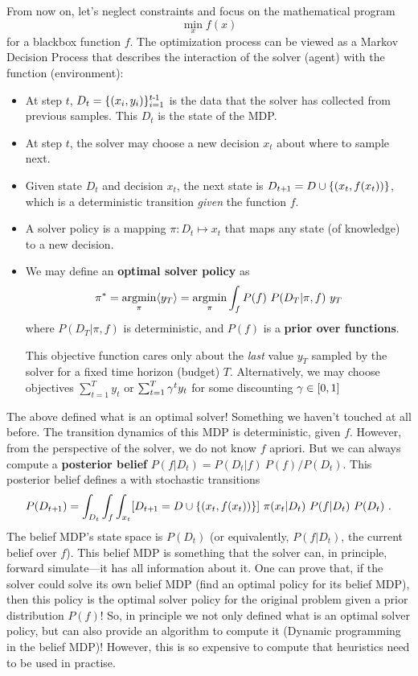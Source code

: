 From now on, let's neglect constraints and focus on the mathematical
program
\begin{equation}
\min_x f(x)
\end{equation}
for a blackbox function $f$. The optimization process
can be viewed as a Markov Decision Process that describes the
interaction of the solver (agent) with the function (environment):
\begin{itemize}
\item At step $t$, $D_t=\{ (x_i,y_i) \}_{i=1}^{t{{\hspace*{-.0pt}\text{\rm -}\hspace*{-.5pt}}1}}$ is the data that
the solver has collected from previous samples. This $D_t$ is the
state of the MDP.
\item At step $t$, the solver may choose a new decision $x_t$ about
where to sample next.
\item Given state $D_t$ and decision $x_t$, the next state is
$D_{t{{\hspace*{-.0pt}\text{\rm +}\hspace*{-.5pt}}1}} = D \cup \{(x_t,f(x_t))\}$, which is a deterministic
transition \emph{given} the function $f$.
\item A solver policy is a mapping $\pi: D_t \mapsto x_t$ that maps
any state (of knowledge) to a new decision.
\item We may define an \textbf{optimal solver policy} as
\begin{equation}
\pi^* = \operatorname*{argmin}_\pi \langle y_T \rangle = \operatorname*{argmin}_\pi \int_f
P(f)~ P(D_T|\pi,f)~ y_T
\end{equation}
where $P(D_T|\pi,f)$ is deterministic, and $P(f)$ is a \textbf{prior
over functions}.

This objective function cares only about the \emph{last} value $y_T$
sampled by the solver for a fixed time horizon (budget) $T$. Alternatively, we
may choose objectives $\sum_{t=1}^T y_t$ or $\sum_{t=1}^T \gamma^t y_t$
for some discounting $\gamma\in[0,1]$
\end{itemize}

The above defined what is an optimal solver! Something we haven't
touched at all before. The transition dynamics of this MDP is
deterministic, given $f$. However, from the perspective of the solver,
we do not know $f$ apriori. But we can always compute
a \textbf{posterior belief} $P(f|D_t) = P(D_t|f)~ P(f)/P(D_t)$. This
posterior belief defines a  with stochastic transitions
\begin{equation}
P(D_{t{{\hspace*{-.0pt}\text{\rm +}\hspace*{-.5pt}}1}}) = \int_{D_t} \int_f \int_{x_t} [D_{t{{\hspace*{-.0pt}\text{\rm +}\hspace*{-.5pt}}1}} =
D \cup \{(x_t,f(x_t))\}]~ \pi(x_t|D_t)~ P(f|D_t)~ P(D_t) ~.
\end{equation}
The belief
MDP's state space is $P(D_t)$ (or equivalently, $P(f|D_t)$, the
current belief over $f$). This belief MDP is something that the solver
can, in principle, forward simulate---it has all information about
it. One can prove that, if the solver could solve its own belief MDP
(find an optimal policy for its belief MDP), then this policy is the
optimal solver policy for the original problem given a prior distribution $P(f)$! So, in
principle we not only defined what is an optimal solver policy, but
can also provide an algorithm to compute it (Dynamic programming in
the belief MDP)! However, this is so expensive to compute that
heuristics need to be used in practise.

